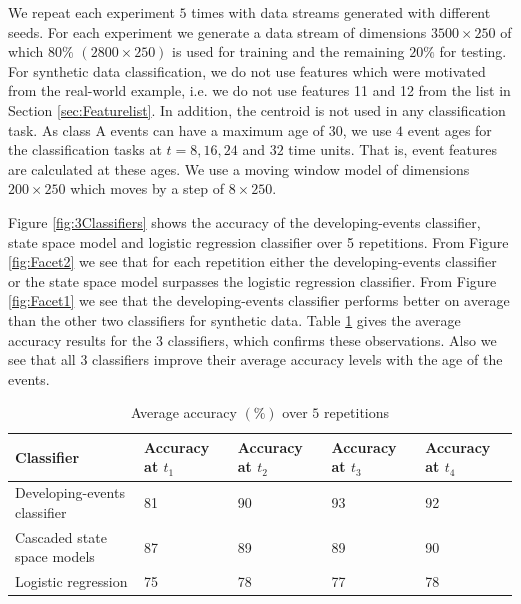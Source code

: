 \documentclass[11pt]{article}
\begin{document}
	
	We repeat each experiment $5$ times with data streams generated with different seeds. For each experiment we generate a data stream of dimensions $3500 \times 250 $ of which $80\%$  $(2800 \times 250 )$ is used for training and the remaining $20\%$ for testing. For  synthetic data classification, we do not use features which were motivated from the real-world example, i.e. we do not use features 11 and 12 from the list in Section \ref{sec:Featurelist}. In addition, the centroid is not used in any classification task. As class A events can have a maximum age of $30$, we use $4$ event ages for the classification tasks at  $t = 8, 16, 24$ and  $32$ time units. That is, event features are calculated at these ages.  We use a moving window model of dimensions $200 \times 250 $ which moves by a step of $ 8 \times 250$. 
	
	Figure \ref{fig:3Classifiers} shows the accuracy of the developing-events classifier, state space model and logistic regression classifier over 5 repetitions. 	From Figure \ref{fig:Facet2} we see that for each repetition either the developing-events classifier or the state space model surpasses the logistic regression classifier. From Figure  \ref{fig:Facet1} we see that the developing-events classifier performs better on average than the other two classifiers for synthetic data.  Table \ref{tab:Results_Synthetic} gives the average accuracy results for the 3 classifiers, which confirms these observations. Also we see that all 3 classifiers improve their average accuracy levels with the age of the events.
	
		
	\begin{table}[H]
		\centering
		\caption{Average accuracy $(\%)$ over $5$ repetitions }
		\footnotesize
		\begin{tabular}{p{6cm}p{1cm}p{1cm}p{1cm}p{1cm}}
			\toprule
			Classifier & Accuracy at $t_1$ & Accuracy at $t_2$  & Accuracy at $t_3$ & Accuracy at $t_4$    \\
			\midrule
			Developing-events classifier    & 81 	& 90  & 93 & 92        \\
			Cascaded state space models    & 87 	& 89  & 89 & 90        \\
			Logistic regression & 75 & 78 & 77 & 78  	\\
			\bottomrule
		\end{tabular}
		\label{tab:Results_Synthetic}
	\end{table}
	
\end{document}
